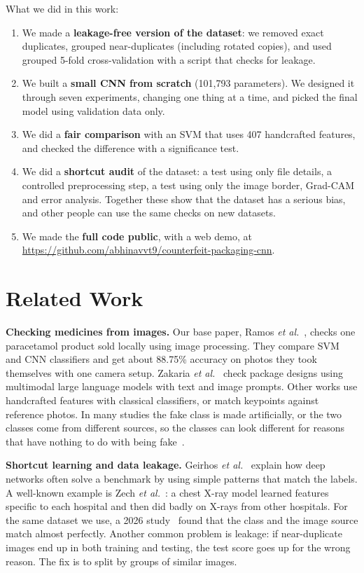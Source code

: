 \documentclass[conference]{IEEEtran}
\newcommand{\repourl}{https://github.com/abhinavvt9/counterfeit-packaging-cnn}
\begin{document}
\noindent What we did in this work:
\begin{enumerate}
\item We made a \textbf{leakage-free version of the dataset}: we removed exact duplicates, grouped near-duplicates (including rotated copies), and used grouped 5-fold cross-validation with a script that checks for leakage.
\item We built a \textbf{small CNN from scratch} (101{,}793 parameters). We designed it through seven experiments, changing one thing at a time, and picked the final model using validation data only.
\item We did a \textbf{fair comparison} with an SVM that uses 407 handcrafted features, and checked the difference with a significance test.
\item We did a \textbf{shortcut audit} of the dataset: a test using only file details, a controlled preprocessing step, a test using only the image border, Grad-CAM and error analysis. Together these show that the dataset has a serious bias, and other people can use the same checks on new datasets.
\item We made the \textbf{full code public}, with a web demo, at \url{\repourl}.
\end{enumerate}

\section{Related Work}
\textbf{Checking medicines from images.} Our base paper, Ramos \emph{et al.}~\cite{ramos2024}, checks one paracetamol product sold locally using image processing. They compare SVM and CNN classifiers and get about 88.75\% accuracy on photos they took themselves with one camera setup. Zakaria \emph{et al.}~\cite{zakaria2025} check package designs using multimodal large language models with text and image prompts. Other works use handcrafted features with classical classifiers, or match keypoints against reference photos. In many studies the fake class is made artificially, or the two classes come from different sources, so the classes can look different for reasons that have nothing to do with being fake~\cite{provenance2026}.

\textbf{Shortcut learning and data leakage.} Geirhos \emph{et al.}~\cite{geirhos2020} explain how deep networks often solve a benchmark by using simple patterns that match the labels. A well-known example is Zech \emph{et al.}~\cite{zech2018}: a chest X-ray model learned features specific to each hospital and then did badly on X-rays from other hospitals. For the same dataset we use, a 2026 study~\cite{provenance2026} found that the class and the image source match almost perfectly. Another common problem is leakage: if near-duplicate images end up in both training and testing, the test score goes up for the wrong reason. The fix is to split by groups of similar images.
\end{document}
